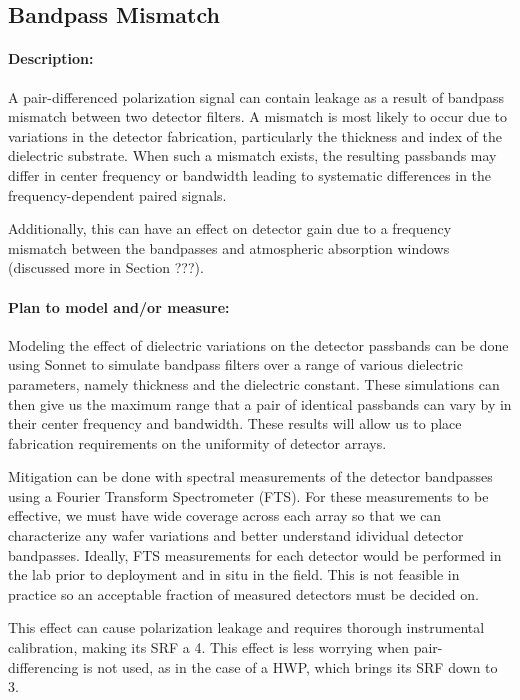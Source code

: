 \subsection{Bandpass Mismatch}
\paragraph{Description:}
A pair-differenced polarization signal can contain leakage as a result of bandpass mismatch between two detector filters. A mismatch is most likely to occur due to variations in the detector fabrication, particularly the thickness and index of the dielectric substrate. When such a mismatch exists, the resulting passbands may differ in center frequency or bandwidth leading to systematic differences in the frequency-dependent paired signals.

Additionally, this can have an effect on detector gain due to a frequency mismatch between the bandpasses and atmospheric absorption windows (discussed more in Section ???).

\paragraph{Plan to model and/or measure:}
Modeling the effect of dielectric variations on the detector passbands can be done using Sonnet to simulate bandpass filters over a range of various dielectric parameters, namely thickness and the dielectric constant. These simulations can then give us the maximum range that a pair of identical passbands can vary by in their center frequency and bandwidth. These results will allow us to place fabrication requirements on the uniformity of detector arrays.

Mitigation can be done with spectral measurements of the detector bandpasses using a Fourier Transform Spectrometer (FTS). For these measurements to be effective, we must have wide coverage across each array so that we can characterize any wafer variations and better understand idividual detector bandpasses. Ideally, FTS measurements for each detector would be performed in the lab prior to deployment and in situ in the field. This is not feasible in practice so an acceptable fraction of measured detectors must be decided on.

This effect can cause polarization leakage and requires thorough instrumental calibration, making its SRF a 4. This effect is less worrying when pair-differencing is not used, as in the case of a HWP, which brings its SRF down to 3.

